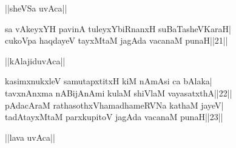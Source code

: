 \documentclass{article}
\begin{document}
\begin{center}
||sheVSa uvAca||
\end{center}

sa vAkeyxYH pavinA tuleyxYbiRnanxH suBaTasheVKaraH|\\
cukoVpa haqdayeV tayxMtaM jagAda vacanaM punaH||21||\\

\begin{center}
||kAlajiduvAca||
\end{center}

kasimxnukxleV samutapxtitxH kiM nAmAsi ca bAlaka|\\
tavxnAnxma nABijAnAmi kulaM shiVlaM vayasatxthA||22||\\
pAdacAraM rathasothxVhamadhameRVNa kathaM jayeV|\\
tadAtayxMtaM parxkupitoV jagAda vacanaM punaH||23||\\

\begin{center}
||lava uvAca||
\end{center}
\end{document}
